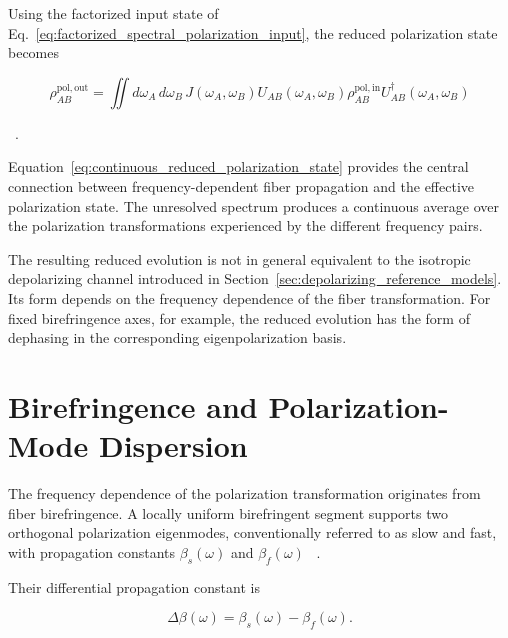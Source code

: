 Using the factorized input state of
Eq.~\eqref{eq:factorized_spectral_polarization_input}, the reduced polarization
state becomes

\begin{equation}
\boxed{
\rho_{AB}^{\mathrm{pol,out}}
=
\iint
d\omega_A\,d\omega_B\,
J(\omega_A,\omega_B)
U_{AB}(\omega_A,\omega_B)
\rho_{AB}^{\mathrm{pol,in}}
U_{AB}^{\dagger}(\omega_A,\omega_B)
}
\label{eq:continuous_reduced_polarization_state}
\end{equation}

~\cite{poon_law_stochastic_pmd_2008,
antonelli_shtaif_brodsky_pmd_2011}.

Equation~\eqref{eq:continuous_reduced_polarization_state} provides the central
connection between frequency-dependent fiber propagation and the effective
polarization state. The unresolved spectrum produces a continuous average over
the polarization transformations experienced by the different frequency pairs.

The resulting reduced evolution is not in general equivalent to the isotropic
depolarizing channel introduced in
Section~\ref{sec:depolarizing_reference_models}. Its form depends on the
frequency dependence of the fiber transformation. For fixed birefringence axes,
for example, the reduced evolution has the form of dephasing in the corresponding
eigenpolarization basis.



\section{Birefringence and Polarization-Mode Dispersion}
\label{sec:birefringence_and_pmd}

The frequency dependence of the polarization transformation originates from fiber
birefringence. A locally uniform birefringent segment supports two orthogonal
polarization eigenmodes, conventionally referred to as slow and fast, with
propagation constants \(\beta_s(\omega)\) and \(\beta_f(\omega)\)
~\cite{gordon_kogelnik_pmd_2000,
wai_menyuk_random_birefringence_1996}.

Their differential propagation constant is

\begin{equation}
\Delta\beta(\omega)
=
\beta_s(\omega)-\beta_f(\omega).
\label{eq:differential_propagation_constant}
\end{equation}

